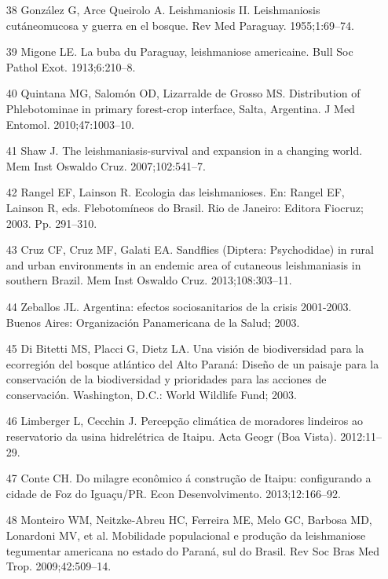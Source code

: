 \documentclass{article}
\begin{document}
\begin{itemize}
\item[38] González G, Arce Queirolo A. Leishmaniosis II. Leishmaniosis
cutáneomucosa y guerra en el bosque. Rev Med Paraguay. 1955;1:69–74.

\item[39] Migone LE. La buba du Paraguay, leishmaniose americaine. Bull Soc
Pathol Exot. 1913;6:210–8.

\item[40] Quintana MG, Salomón OD, Lizarralde de Grosso MS. Distribution of
Phlebotominae in primary forest-crop interface, Salta, Argentina. J Med Entomol.
2010;47:1003–10.

\item[41] Shaw J. The leishmaniasis-survival and expansion in a changing
world. Mem Inst Oswaldo Cruz. 2007;102:541–7.

\item[42] Rangel EF, Lainson R. Ecologia das leishmanioses. En: Rangel EF,
Lainson R, eds. Flebotomíneos do Brasil. Rio de Janeiro: Editora Fiocruz; 2003.
Pp. 291–310.

\item[43] Cruz CF, Cruz MF, Galati EA. Sandflies (Diptera: Psychodidae) in
rural and urban environments in an endemic area of cutaneous leishmaniasis in
southern Brazil. Mem Inst Oswaldo Cruz. 2013;108:303–11.

\item[44] Zeballos JL. Argentina: efectos sociosanitarios de la crisis
2001-2003. Buenos Aires: Organización Panamericana de la Salud; 2003.

\item[45] Di Bitetti MS, Placci G, Dietz LA. Una visión de biodiversidad para
la ecorregión del bosque atlántico del Alto Paraná: Diseño de un paisaje para la
conservación de la biodiversidad y prioridades para las acciones de
conservación. Washington, D.C.: World Wildlife Fund; 2003.

\item[46] Limberger L, Cecchin J. Percepção climática de moradores lindeiros
ao reservatorio da usina hidrelétrica de Itaipu. Acta Geogr (Boa Vista).
2012:11–29.

\item[47] Conte CH. Do milagre econômico á construção de Itaipu: configurando
a cidade de Foz do Iguaçu/PR. Econ Desenvolvimento. 2013;12:166–92.

\item[48] Monteiro WM, Neitzke-Abreu HC, Ferreira ME, Melo GC, Barbosa MD,
Lonardoni MV, et al. Mobilidade populacional e produção da leishmaniose
tegumentar americana no estado do Paraná, sul do Brasil. Rev Soc Bras Med Trop.
2009;42:509–14.


\end{itemize}
\end{document}
